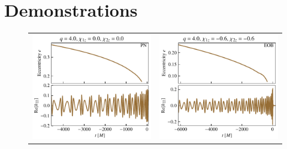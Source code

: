 \documentclass[aps,prd,amsmath,floats,floatfix, twocolumn,
superscriptaddress,nofootinbib,showpacs]{revtex4-1}
\begin{document}
\section{Demonstrations}
\label{sec:demonstrations}
\begin{figure}[htb]
  \centering
  \begin{tabular}{cc}
    \includegraphics[width=\columnwidth]{demo_PN} & \includegraphics[width=\columnwidth]{demo_EOB}\\

\end{tabular}
\end{figure}
\end{document}

